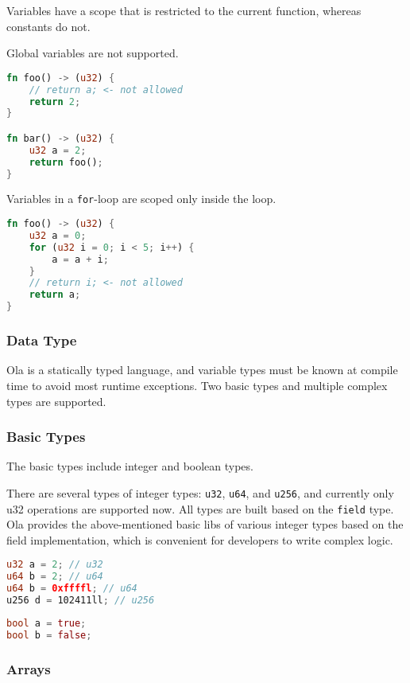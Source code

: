 Variables have a scope that is restricted to the current function, whereas constants do not.

Global variables are not supported.

\begin{lstlisting}[language=rust]
fn foo() -> (u32) {
    // return a; <- not allowed
    return 2;
}

fn bar() -> (u32) {
    u32 a = 2;
    return foo();
}
\end{lstlisting}

Variables in a \verb|for|-loop are scoped only inside the loop.

\begin{lstlisting}[language=rust]
fn foo() -> (u32) {
    u32 a = 0;
    for (u32 i = 0; i < 5; i++) {
        a = a + i;
    }
    // return i; <- not allowed
    return a;
}
\end{lstlisting}

\subsubsection{Data Type}

Ola is a statically typed language, and variable types must be known at compile time to avoid most runtime exceptions. 
Two basic types and multiple complex types are supported.

\subsubsection*{Basic Types}

The basic types include integer and boolean types.

There are several types of integer types: \texttt{u32}, \texttt{u64}, and \texttt{u256}, and currently only u32 operations are supported now. 
All types are built based on the \texttt{field} type.
Ola provides the above-mentioned basic libs of various integer types based on the field implementation, which is convenient for developers to write complex logic.

\begin{lstlisting}[language=rust]
u32 a = 2; // u32
u64 b = 2; // u64
u64 b = 0xffffl; // u64
u256 d = 102411ll; // u256
\end{lstlisting}

\begin{lstlisting}[language=rust]
bool a = true;
bool b = false;
\end{lstlisting}
\subsubsection*{Arrays}

